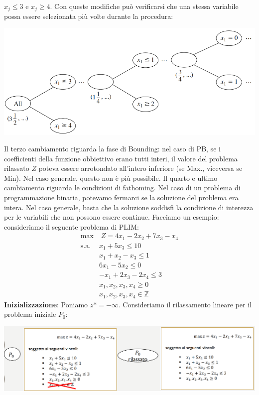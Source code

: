 \documentclass[12pt]{article}
\begin{document}
$x_j \leq 3$ e $x_j \geq 4$. \newline 
Con queste modifiche può verificarsi che una stessa variabile possa essere selezionata più volte durante la procedura:
\begin{center}
    \includegraphics[width = 0.90\linewidth]{Images/72.png}
\end{center}
Il terzo cambiamento riguarda la fase di Bounding: nel caso di PB, se i coefficienti della funzione obbiettivo erano tutti interi,
il valore del problema rilassato $Z$ poteva essere arrotondato all'intero inferiore (se Max., viceversa se Min).
Nel caso generale, questo non è più possibile.
Il quarto e ultimo cambiamento riguarda le condizioni di fathoming.
Nel caso di un problema di programmazione binaria, potevamo fermarci se la soluzione del problema era intera.
Nel caso generale, basta che la soluzione soddisfi la condizione di interezza per le variabili che non possono essere continue.
Facciamo un esempio: consideriamo il seguente problema di PLIM:
\begin{equation*}
    \begin{array}{ll}
        \displaystyle \textrm{max} & \; Z = 4x_1 - 2x_2 + 7x_3 - x_4\\
        \textrm{s.a.} & x_1 + 5x_3 \leq 10\\
        \phantom{} & x_1 + x_2 - x_3 \leq 1\\
        \phantom{} & 6x_1 - 5x_2 \leq 0\\
        \phantom{} & -x_1 + 2x_3 - 2x_4 \leq 3 \\
        \textrm{}  &  x_1,x_2,x_3,x_4 \geq 0\\
        \phantom{} &  x_1, x_2, x_3, x_4 \in \mathbb{Z}
    \end{array}
\end{equation*}
\textbf{Inizializzazione}: Poniamo $z* = -\infty$. Consideriamo il rilassamento lineare per il problema iniziale $P_0$:
\begin{center}
    \includegraphics[width = 1\linewidth]{Images/73.png}
\end{center}
\end{document}
